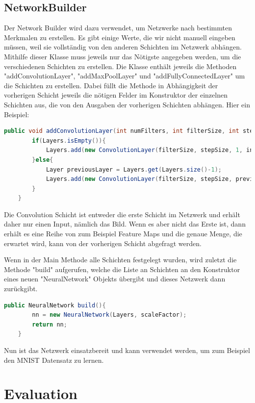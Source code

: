 \documentclass[12pt]{article}
\begin{document}
\subsection{NetworkBuilder}
Der Network Builder wird dazu verwendet, um Netzwerke nach bestimmten Merkmalen zu erstellen. Es gibt einige Werte, die wir nicht manuell eingeben müssen, weil sie vollständig von den anderen Schichten im Netzwerk abhängen. Mithilfe dieser Klasse muss jeweils nur das Nötigste angegeben werden, um die verschiedenen Schichten zu erstellen.
Die Klasse enthält jeweils die Methoden "addConvolutionLayer", "addMaxPoolLayer" und "addFullyConnectedLayer" um die Schichten zu erstellen. Dabei füllt die Methode in Abhängigkeit der vorherigen Schicht jeweils die nötigen Felder im Konstruktor der einzelnen Schichten aus, die von den Ausgaben der vorherigen Schichten abhängen. Hier ein Beispiel:
\begin{lstlisting}[language=Java]
public void addConvolutionLayer(int numFilters, int filterSize, int stepSize, double learnRate){
        if(Layers.isEmpty()){
            Layers.add(new ConvolutionLayer(filterSize, stepSize, 1, inputRows, inputCols, numFilters, learnRate));
        }else{
            Layer previousLayer = Layers.get(Layers.size()-1);
            Layers.add(new ConvolutionLayer(filterSize, stepSize, previousLayer.getOutputLength(), previousLayer.getOutputRows(), previousLayer.getOutputCols(), numFilters, learnRate));
        }
    }
\end{lstlisting}
Die Convolution Schicht ist entweder die erste Schicht im Netzwerk und erhält daher nur einen Input, nämlich das Bild. Wenn es aber nicht das Erste ist, dann erhält es eine Reihe von zum Beispiel Feature Maps und die genaue Menge, die erwartet wird, kann von der vorherigen Schicht abgefragt werden.

Wenn in der Main Methode alle Schichten festgelegt wurden, wird zuletzt die Methode "build" aufgerufen, welche die Liste an Schichten an den Konstruktor eines neuen "NeuralNetwork" Objekts übergibt und dieses Netzwerk dann zurückgibt.
\begin{lstlisting}[language=Java]
public NeuralNetwork build(){
        nn = new NeuralNetwork(Layers, scaleFactor);
        return nn;
    }
\end{lstlisting}

Nun ist das Netzwerk einsatzbereit und kann verwendet werden, um zum Beispiel den MNIST Datensatz zu lernen.


\cleardoublepage
\section{Evaluation}
\end{document}

